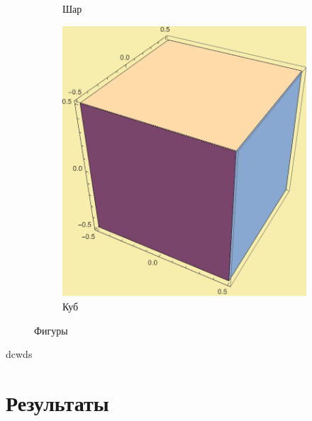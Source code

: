 \documentclass[12pt, a4paper]{article}
\begin{document}
\begin{enumerate}
\begin{figure}
\begin{subfigure}{0.3\textwidth}
				\caption{Шар}
				\label{fig:second}
			\end{subfigure}
			\hfill
			\begin{subfigure}{0.3\textwidth}
				\includegraphics[width=\textwidth]{cube}
				\caption{Куб}
				\label{fig:third}
			\end{subfigure}
			
			\caption{Фигуры}
			\label{fig:figures}
		\end{figure}
	\end{enumerate}
	\newpage
	dcwds
	\newpage
\section{Результаты}
\end{document}
